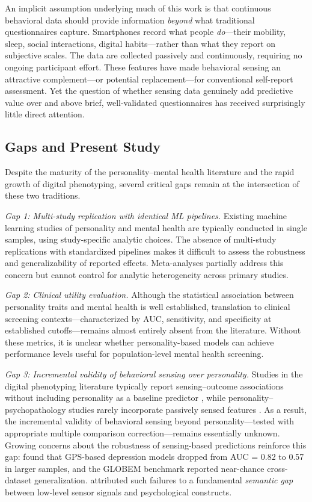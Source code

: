\documentclass[12pt, a4paper]{article}
\begin{document}
An implicit assumption underlying much of this work is that continuous behavioral data should provide information \textit{beyond} what traditional questionnaires capture. Smartphones record what people \textit{do}---their mobility, sleep, social interactions, digital habits---rather than what they report on subjective scales. The data are collected passively and continuously, requiring no ongoing participant effort. These features have made behavioral sensing an attractive complement---or potential replacement---for conventional self-report assessment. Yet the question of whether sensing data genuinely add predictive value over and above brief, well-validated questionnaires has received surprisingly little direct attention.

\subsection{Gaps and Present Study}

Despite the maturity of the personality--mental health literature and the rapid growth of digital phenotyping, several critical gaps remain at the intersection of these two traditions.

\textit{Gap 1: Multi-study replication with identical ML pipelines.} Existing machine learning studies of personality and mental health are typically conducted in single samples, using study-specific analytic choices. The absence of multi-study replications with standardized pipelines makes it difficult to assess the robustness and generalizability of reported effects. Meta-analyses partially address this concern but cannot control for analytic heterogeneity across primary studies.

\textit{Gap 2: Clinical utility evaluation.} Although the statistical association between personality traits and mental health is well established, translation to clinical screening contexts---characterized by AUC, sensitivity, and specificity at established cutoffs---remains almost entirely absent from the literature. Without these metrics, it is unclear whether personality-based models can achieve performance levels useful for population-level mental health screening.

\textit{Gap 3: Incremental validity of behavioral sensing over personality.} Studies in the digital phenotyping literature typically report sensing--outcome associations without including personality as a baseline predictor \citep{chikersal2021detecting, wang2018sensing, saeb2015mobile}, while personality--psychopathology studies rarely incorporate passively sensed features \citep{kotov2010linking, lahey2009public}. As a result, the incremental validity of behavioral sensing beyond personality---tested with appropriate multiple comparison correction---remains essentially unknown. Growing concerns about the robustness of sensing-based predictions reinforce this gap: \citet{muller2021depression} found that GPS-based depression models dropped from AUC = 0.82 to 0.57 in larger samples, and the GLOBEM benchmark \citep{xu2022globem} reported near-chance cross-dataset generalization. \citet{dasswain2022semantic} attributed such failures to a fundamental \textit{semantic gap} between low-level sensor signals and psychological constructs.
\end{document}
